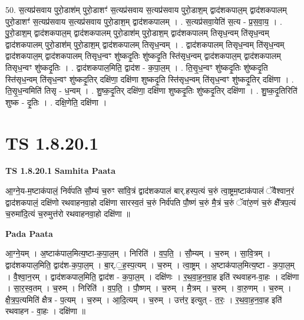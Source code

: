 \documentclass[17pt]{extarticle}
\begin{document}
50. स॒त्यप्र॑सवाय पुरो॒डाश॑म् पुरो॒डाशꣳ॑ स॒त्यप्र॑सवाय स॒त्यप्र॑सवाय पुरो॒डाश॒म् द्वाद॑शकपाल॒म् द्वाद॑शकपालम् पुरो॒डाशꣳ॑ स॒त्यप्र॑सवाय स॒त्यप्र॑सवाय पुरो॒डाश॒म् द्वाद॑शकपालम् । . स॒त्यप्र॑सवा॒येति॑ स॒त्य - प्र॒स॒वा॒य॒ । . पु॒रो॒डाश॒म् द्वाद॑शकपाल॒म् द्वाद॑शकपालम् पुरो॒डाश॑म् पुरो॒डाश॒म् द्वाद॑शकपालम् तिसृध॒न्वम् ति॑सृध॒न्वम् द्वाद॑शकपालम् पुरो॒डाश॑म् पुरो॒डाश॒म् द्वाद॑शकपालम् तिसृध॒न्वम् । . द्वाद॑शकपालम् तिसृध॒न्वम् ति॑सृध॒न्वम् द्वाद॑शकपाल॒म् द्वाद॑शकपालम् तिसृध॒न्वꣳ शु॑ष्कदृ॒तिः शु॑ष्कदृ॒ति स्ति॑सृध॒न्वम् द्वाद॑शकपाल॒म् द्वाद॑शकपालम् तिसृध॒न्वꣳ शु॑ष्कदृ॒तिः । . द्वाद॑शकपाल॒मिति॒ द्वाद॑श - क॒पा॒ल॒म् । . ति॒सृ॒ध॒न्वꣳ शु॑ष्कदृ॒तिः शु॑ष्कदृ॒ति स्ति॑सृध॒न्वम् ति॑सृध॒न्वꣳ शु॑ष्कदृ॒तिर् दक्षि॑णा॒ दक्षि॑णा शुष्कदृ॒ति स्ति॑सृध॒न्वम् ति॑सृध॒न्वꣳ शु॑ष्कदृ॒तिर् दक्षि॑णा । . ति॒सृ॒ध॒न्वमिति॑ तिसृ - ध॒न्वम् । . शु॒ष्क॒दृ॒तिर् दक्षि॑णा॒ दक्षि॑णा शुष्कदृ॒तिः शु॑ष्कदृ॒तिर् दक्षि॑णा । . शु॒ष्क॒दृ॒तिरिति॑ शुष्क - दृ॒तिः । . दक्षि॒णेति॒ दक्षि॑णा । \newline
\pagebreak
{}
\section*{ TS 1.8.20.1 }

\textbf{TS 1.8.20.1 } \newline
\textbf{Samhita Paata} \newline

आ॒ग्ने॒य-म॒ष्टाक॑पालं॒ निर्व॑पति सौ॒म्यं च॒रुꣳ सा॑वि॒त्रं द्वाद॑शकपालं बार्.हस्प॒त्यं च॒रुं त्वा॒ष्ट्रम॒ष्टाक॑पालं ॅवैश्वान॒रं द्वाद॑शकपालं॒ दक्षि॑णो रथवाहनवा॒हो दक्षि॑णा सारस्व॒तं च॒रुं निर्व॑पति पौ॒ष्णं च॒रुं मै॒त्रं च॒रुं ॅवा॑रु॒णं च॒रुं क्षै᳚त्रप॒त्यं च॒रुमा॑दि॒त्यं च॒रुमुत्त॑रो रथवाहनवा॒हो दक्षि॑णा ॥ \newline

\textbf{Pada Paata} \newline

आ॒ग्ने॒यम् । अ॒ष्टाक॑पाल॒मित्य॒ष्टा-क॒पा॒ल॒म् । निरिति॑ । व॒प॒ति॒ । सौ॒म्यम् । च॒रुम् । सा॒वि॒त्रम् । द्वाद॑शकपाल॒मिति॒ द्वाद॑श-क॒पा॒ल॒म् । बा॒र्.॒ह॒स्प॒त्यम् । च॒रुम् । त्वा॒ष्ट्रम् । अ॒ष्टाक॑पाल॒मित्य॒ष्टा - क॒पा॒ल॒म् । वै॒श्वा॒न॒रम् । द्वाद॑शकपाल॒मिति॒ द्वाद॑श - क॒पा॒ल॒म् । दक्षि॑णः । र॒थ॒वा॒ह॒न॒वा॒ह इति॑ रथवाहन-वा॒हः । दक्षि॑णा । सा॒र॒स्व॒तम् । च॒रुम् । निरिति॑ । व॒प॒ति॒ । पौ॒ष्णम् । च॒रुम् । मै॒त्रम् । च॒रुम् । वा॒रु॒णम् । च॒रुम् । क्षै॒त्र॒प॒त्यमिति॑ क्षैत्र - प॒त्यम् । च॒रुम् । आ॒दि॒त्यम् । च॒रुम् । उत्त॑र॒ इत्युत् - त॒रः॒ । र॒थ॒वा॒ह॒न॒वा॒ह इति॑ रथवाहन - वा॒हः । दक्षि॑णा ॥  \newline
\end{document}

